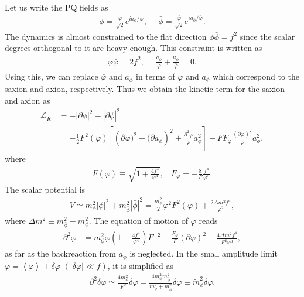 \documentclass[12pt, a4paper]{article}
\begin{document}
Let us write the PQ fields as
\begin{align}
	\phi = \frac{\varphi}{\sqrt 2}e^{ia_\phi/\varphi},~~~~~~\bar\phi = \frac{\bar\varphi}{\sqrt 2}e^{ia_{\bar\phi}/\bar\varphi}.
\end{align}
The dynamics is almost constrained to the flat direction $\phi\bar\phi=f^2$ since
the scalar degrees orthogonal to it are heavy enough.
This constraint is written as
\begin{align}
	\varphi\bar\varphi = 2f^2,~~~~~~
	\frac{a_\phi}{\varphi} + \frac{a_{\bar\phi}}{\bar\varphi} = 0.
\end{align}
Using this, we can replace $\bar\varphi$ and $a_{\bar\phi}$ in terms of $\varphi$ and $a_\phi$
which correspond to the saxion and axion, respectively.
Thus we obtain the kinetic term for the saxion and axion as
\begin{align}
	\mathcal L_K&=-|\partial\phi|^2-|\partial\bar\phi|^2 \\
	&=-\frac{1}{2}F^2(\varphi)\left[\left(\partial\varphi)^2+(\partial a_\phi\right)^2 
	+\frac{\partial^2\varphi}{\varphi}a_\phi^2\right] 
	-F F_\varphi\frac{(\partial\varphi)^2}{\varphi}a_\phi^2,
\end{align}
where
\begin{align}
	F(\varphi) \equiv  \sqrt{1+\frac{4f^4}{\varphi^4}},~~~~F_\varphi =-\frac{8}{F}\frac{f^4}{\varphi^5}.
\end{align}
The scalar potential is
\begin{align}
	V \simeq m_\phi^2|\phi|^2 + m_{\bar\phi}^2|\bar\phi|^2 
	= \frac{m_\phi^2}{2}\varphi^2F^2(\varphi)+\frac{2\Delta m^2 f^4}{\varphi^2},
\end{align}
where $\Delta m^2\equiv m^2_{\bar\phi}-m^2_{\phi}$.
The equation of motion of $\varphi$ reads
\begin{align}
	\partial^2\varphi 
	&= m_\phi^2\varphi \left(1-\frac{4f^4}{\varphi^4}\right) F^{-2} -\frac{F_\varphi}{F}(\partial\varphi)^2-\frac{4\Delta m^2 f^4}{F^2\varphi^3},
	\label{eom_saxion}
\end{align}
as far as the backreaction from $a_\phi$ is neglected.
In the small amplitude limit $\varphi = \left<\varphi\right>+\delta\varphi$ $(|\delta\varphi| \ll f)$, 
it is simplified as
\begin{align}
	\partial^2\delta\varphi \simeq \frac{4m_\phi^2}{F^2}\delta\varphi=
	\frac{4m_\phi^2 m_{\bar\phi}^2}{m_\phi^2+m_{\bar\phi}^2}\delta\varphi \equiv \widetilde m^2_{\phi} \delta\varphi.
\end{align}
\end{document}
